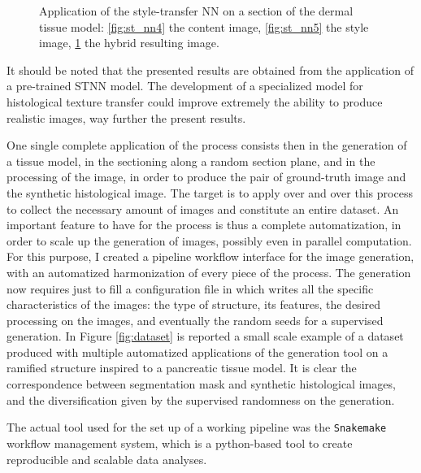 \documentclass[12pt,a4paper]{report}
\begin{document}
\begin{description}
\begin{figure}
\begin{subfigure}[t]{0.3\textwidth}
                 \caption{}
                 \label{fig:st_nn6}
            \end{subfigure}
            \caption{Application of the style-transfer NN on a section of the dermal tissue model: \ref{fig:st_nn4} the content image, \ref{fig:st_nn5} the style image, \ref{fig:st_nn6} the hybrid resulting image.}
            \label{fig:derm_stnn}
        \end{figure}

        It should be noted that the presented results are obtained from the application of a pre-trained STNN model. The development of a specialized model for histological texture transfer could improve extremely the ability to produce realistic images, way further the present results.
    \end{description}

One single complete application of the process consists then in the generation of a tissue model, in the sectioning along a random section plane, and in the processing of the image, in order to produce the pair of ground-truth image and the synthetic histological image. The target is to apply over and over this process to collect the necessary amount of images and constitute an entire dataset. An important feature to have for the process is thus a complete automatization, in order to scale up the generation of images, possibly even in parallel computation.
For this purpose, I created a pipeline workflow interface for the image generation, with an automatized harmonization of every piece of the process. The generation now requires just to fill a configuration file in which writes all the specific characteristics of the images: the type of structure, its features, the desired processing on the images, and eventually the random seeds for a supervised generation. In Figure \ref{fig:dataset} is reported a small scale example of a dataset produced with multiple automatized applications of the generation tool on a ramified structure inspired to a pancreatic tissue model. It is clear the correspondence between segmentation mask and synthetic histological images, and the diversification given by the supervised randomness on the generation.

The actual tool used for the set up of a working pipeline was the \texttt{Snakemake} \cite{10.1093/bioinformatics/bts480} workflow management system, which is a python-based tool to create reproducible and scalable data analyses.
\end{document}
